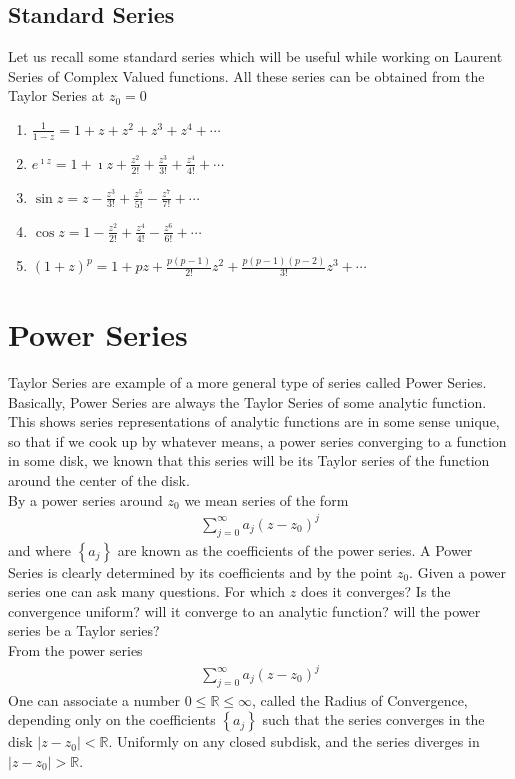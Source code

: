 \documentclass[11pt]{report}
\newcommand{\dsp}{\displaystyle}
\newcommand{\NI}{\noindent}
\newcommand{\real}{ \mathbb{R}}
\newcommand{\imaginary}{\imath}
\begin{document}
	\subsection{Standard Series}
	Let us recall some standard series which will be useful while working on Laurent Series of Complex Valued functions. All these series can be obtained from the Taylor Series at $z_0 = 0$
	\begin{enumerate}
		\item $\dsp \frac{1}{1-z}=1+z+z^2 + z^3 + z^4 + \cdots$
		\item $\dsp e^{\imaginary z} = 1+\imaginary z + \frac{z^2}{2!} + \frac{z^3}{3!} + \frac{z^4}{4!} + \cdots$
		\item $\dsp \sin z = z - \frac{z^3}{3!} + \frac{z^5}{5!} - \frac{z^7}{7!} + \cdots$
		\item $\dsp \cos z = 1 - \frac{z^2}{2!} + \frac{z^4}{4!} - \frac{z^6}{6!}+\cdots$
		\item $\dsp (1+z)^p = 1+ pz + \frac{p(p-1)}{2!}z^2 + \frac{p(p-1)(p-2)}{3!}z^3 + \cdots$
	\end{enumerate}
	
	\section{Power Series}
	Taylor Series are example of a more general type of series called Power Series. Basically, Power Series are always the Taylor Series of some analytic function. This shows series representations of analytic functions are in some sense unique, so that if we cook up by whatever means, a power series converging to a function in some disk, we known that this series will be its Taylor series of the function around the center of the disk.\\
	
	\NI By a power series around $z_0$ we mean series of the form
	\begin{eqnarray}
		\sum_{j=0}^{\infty}a_j(z-z_0)^j
	\end{eqnarray}
	and where $\left\{a_j\right\}$ are known as the coefficients of the power series. A Power Series is clearly determined by its coefficients and by the point $z_0$. Given a power series one can ask many questions. For which $z$ does it converges? Is the convergence uniform? will it converge to an analytic function? will the power series be a Taylor series?\\
	From the power series
	\begin{eqnarray*}
			\sum_{j=0}^{\infty}a_j(z-z_0)^j
	\end{eqnarray*}
	One can associate a number $0 \leq \real \leq \infty$, called the Radius of Convergence, depending only on the coefficients  $\left\{a_j\right\}$ such that the series converges in the disk $|z-z_0|< \real$. Uniformly on any closed subdisk, and the series diverges in $|z-z_0|> \real$.
	
\end{document}
